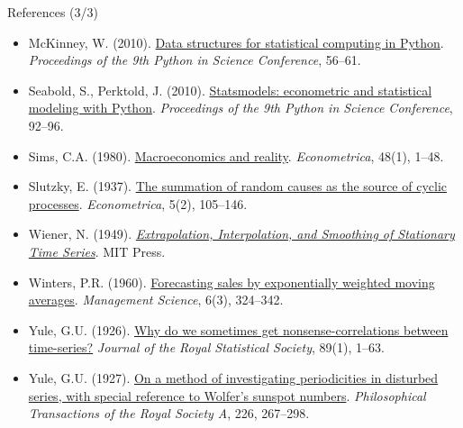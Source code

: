 \begin{frame}{References (3/3)}
\itemsize{\scriptsize}
\begin{itemize}
    \item McKinney, W. (2010). \href{https://doi.org/10.25080/Majora-92bf1922-00a}{Data structures for statistical computing in Python}. \emph{Proceedings of the 9th Python in Science Conference}, 56--61.
    \item Seabold, S., Perktold, J. (2010). \href{https://doi.org/10.25080/Majora-92bf1922-011}{Statsmodels: econometric and statistical modeling with Python}. \emph{Proceedings of the 9th Python in Science Conference}, 92--96.
    \item Sims, C.A. (1980). \href{https://doi.org/10.2307/1912017}{Macroeconomics and reality}. \emph{Econometrica}, 48(1), 1--48.
    \item Slutzky, E. (1937). \href{https://doi.org/10.2307/1907241}{The summation of random causes as the source of cyclic processes}. \emph{Econometrica}, 5(2), 105--146.
    \item Wiener, N. (1949). \href{https://doi.org/10.7551/mitpress/2946.001.0001}{\emph{Extrapolation, Interpolation, and Smoothing of Stationary Time Series}}. MIT Press.
    \item Winters, P.R. (1960). \href{https://doi.org/10.1287/mnsc.6.3.324}{Forecasting sales by exponentially weighted moving averages}. \emph{Management Science}, 6(3), 324--342.
    \item Yule, G.U. (1926). \href{https://doi.org/10.2307/2341482}{Why do we sometimes get nonsense-correlations between time-series?} \emph{Journal of the Royal Statistical Society}, 89(1), 1--63.
    \item Yule, G.U. (1927). \href{https://doi.org/10.1098/rsta.1927.0007}{On a method of investigating periodicities in disturbed series, with special reference to Wolfer's sunspot numbers}. \emph{Philosophical Transactions of the Royal Society A}, 226, 267--298.
\end{itemize}
\end{frame}


